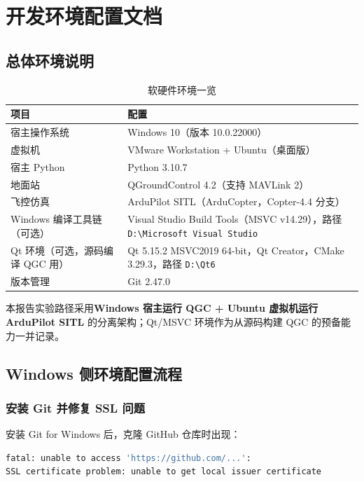 \documentclass[12pt,a4paper]{article}
\begin{document}
\section{开发环境配置文档}

\subsection{总体环境说明}

\begin{table}[htbp]
\centering
\caption{软硬件环境一览}
\begin{tabular}{ll}
\toprule
\textbf{项目} & \textbf{配置} \\
\midrule
宿主操作系统 & Windows 10（版本 10.0.22000） \\
虚拟机 & VMware Workstation + Ubuntu（桌面版） \\
宿主 Python & Python 3.10.7 \\
地面站 & QGroundControl 4.2（支持 MAVLink 2） \\
飞控仿真 & ArduPilot SITL（ArduCopter，Copter-4.4 分支） \\
Windows 编译工具链（可选） & Visual Studio Build Tools（MSVC v14.29），路径 \texttt{D:\textbackslash Microsoft Visual Studio} \\
Qt 环境（可选，源码编译 QGC 用） & Qt 5.15.2 MSVC2019 64-bit，Qt Creator，CMake 3.29.3，路径 \texttt{D:\textbackslash Qt6} \\
版本管理 & Git 2.47.0 \\
\bottomrule
\end{tabular}
\end{table}

本报告实验路径采用\textbf{Windows 宿主运行 QGC + Ubuntu 虚拟机运行 ArduPilot SITL} 的分离架构；Qt/MSVC 环境作为从源码构建 QGC 的预备能力一并记录。

\subsection{Windows 侧环境配置流程}

\subsubsection{安装 Git 并修复 SSL 问题}

安装 Git for Windows 后，克隆 GitHub 仓库时出现：
\begin{lstlisting}[language=bash]
fatal: unable to access 'https://github.com/...':
SSL certificate problem: unable to get local issuer certificate
\end{lstlisting}
\end{document}
